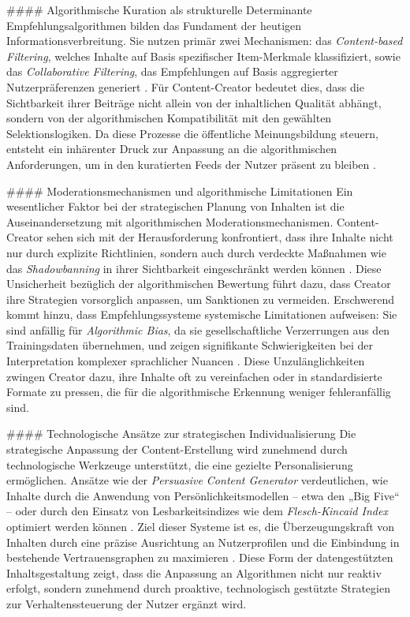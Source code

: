 \documentclass[11pt,a4paper]{article}
\begin{document}
\#\#\#\# Algorithmische Kuration als strukturelle Determinante Empfehlungsalgorithmen bilden das Fundament der heutigen Informationsverbreitung. Sie nutzen primär zwei Mechanismen: das \textit{Content-based Filtering}, welches Inhalte auf Basis spezifischer Item-Merkmale klassifiziert, sowie das \textit{Collaborative Filtering}, das Empfehlungen auf Basis aggregierter Nutzerpräferenzen generiert \autocite{crossref_10_31219_osf_io_y4kwm}. Für Content-Creator bedeutet dies, dass die Sichtbarkeit ihrer Beiträge nicht allein von der inhaltlichen Qualität abhängt, sondern von der algorithmischen Kompatibilität mit den gewählten Selektionslogiken. Da diese Prozesse die öffentliche Meinungsbildung steuern, entsteht ein inhärenter Druck zur Anpassung an die algorithmischen Anforderungen, um in den kuratierten Feeds der Nutzer präsent zu bleiben \autocite{crossref_10_31219_osf_io_y4kwm}.

\#\#\#\# Moderationsmechanismen und algorithmische Limitationen Ein wesentlicher Faktor bei der strategischen Planung von Inhalten ist die Auseinandersetzung mit algorithmischen Moderationsmechanismen. Content-Creator sehen sich mit der Herausforderung konfrontiert, dass ihre Inhalte nicht nur durch explizite Richtlinien, sondern auch durch verdeckte Maßnahmen wie das \textit{Shadowbanning} in ihrer Sichtbarkeit eingeschränkt werden können \autocite{crossref_10_31219_osf_io_y4kwm}. Diese Unsicherheit bezüglich der algorithmischen Bewertung führt dazu, dass Creator ihre Strategien vorsorglich anpassen, um Sanktionen zu vermeiden. Erschwerend kommt hinzu, dass Empfehlungssysteme systemische Limitationen aufweisen: Sie sind anfällig für \textit{Algorithmic Bias}, da sie gesellschaftliche Verzerrungen aus den Trainingsdaten übernehmen, und zeigen signifikante Schwierigkeiten bei der Interpretation komplexer sprachlicher Nuancen \autocite{crossref_10_31219_osf_io_y4kwm,openalex_W2805992252}. Diese Unzulänglichkeiten zwingen Creator dazu, ihre Inhalte oft zu vereinfachen oder in standardisierte Formate zu pressen, die für die algorithmische Erkennung weniger fehleranfällig sind.

\#\#\#\# Technologische Ansätze zur strategischen Individualisierung Die strategische Anpassung der Content-Erstellung wird zunehmend durch technologische Werkzeuge unterstützt, die eine gezielte Personalisierung ermöglichen. Ansätze wie der \textit{Persuasive Content Generator} verdeutlichen, wie Inhalte durch die Anwendung von Persönlichkeitsmodellen – etwa den „Big Five“ – oder durch den Einsatz von Lesbarkeitsindizes wie dem \textit{Flesch-Kincaid Index} optimiert werden können \autocite{crossref_10_22215_etd_2019_13484}. Ziel dieser Systeme ist es, die Überzeugungskraft von Inhalten durch eine präzise Ausrichtung an Nutzerprofilen und die Einbindung in bestehende Vertrauensgraphen zu maximieren \autocite{crossref_10_22215_etd_2019_13484}. Diese Form der datengestützten Inhaltsgestaltung zeigt, dass die Anpassung an Algorithmen nicht nur reaktiv erfolgt, sondern zunehmend durch proaktive, technologisch gestützte Strategien zur Verhaltenssteuerung der Nutzer ergänzt wird.
\end{document}
